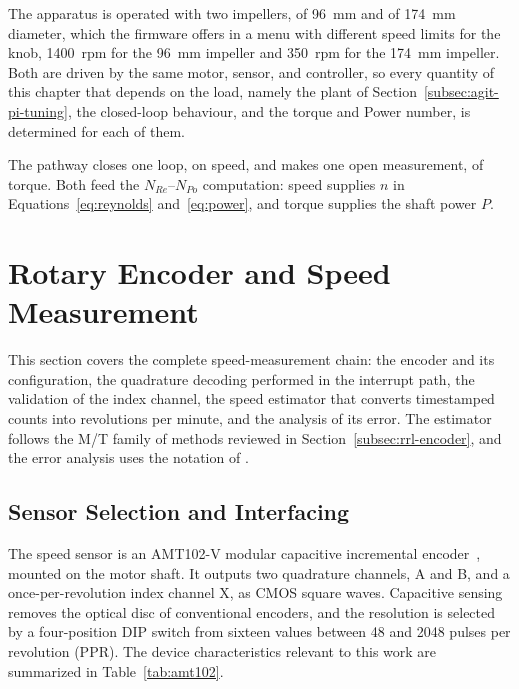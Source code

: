 The apparatus is operated with two impellers, of 96~mm and of 174~mm diameter, which the firmware offers in a menu with different speed limits for the knob, 1400~rpm for the 96~mm impeller and 350~rpm for the 174~mm impeller. Both are driven by the same motor, sensor, and controller, so every quantity of this chapter that depends on the load, namely the plant of Section~\ref{subsec:agit-pi-tuning}, the closed-loop behaviour, and the torque and Power number, is determined for each of them.

The pathway closes one loop, on speed, and makes one open measurement, of torque. Both feed the $N_{Re}$--$N_{Po}$ computation: speed supplies $n$ in Equations~\ref{eq:reynolds} and~\ref{eq:power}, and torque supplies the shaft power $P$.


\section{Rotary Encoder and Speed Measurement}
\label{sec:agit-speed}

This section covers the complete speed-measurement chain: the encoder and its configuration, the quadrature decoding performed in the interrupt path, the validation of the index channel, the speed estimator that converts timestamped counts into revolutions per minute, and the analysis of its error. The estimator follows the M/T family of methods reviewed in Section~\ref{subsec:rrl-encoder}, and the error analysis uses the notation of \citet{anuchin2019}.

\subsection{Sensor Selection and Interfacing}
\label{subsec:agit-encoder-sel}

The speed sensor is an AMT102-V modular capacitive incremental encoder~\citep{sameskyamt10}, mounted on the motor shaft. It outputs two quadrature channels, A and B, and a once-per-revolution index channel X, as CMOS square waves. Capacitive sensing removes the optical disc of conventional encoders, and the resolution is selected by a four-position DIP switch from sixteen values between 48 and 2048 pulses per revolution (PPR). The device characteristics relevant to this work are summarized in Table~\ref{tab:amt102}.

